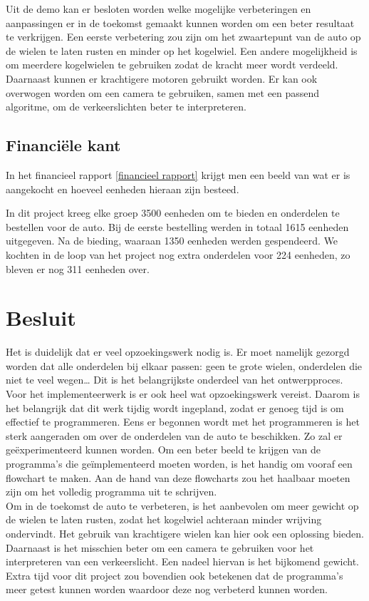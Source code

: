 \documentclass[a4paper,twoside,kulak]{kulakreport} %
\begin{document}
Uit de demo kan er besloten worden welke mogelijke verbeteringen en aanpassingen er in de toekomst gemaakt kunnen worden om een beter resultaat te verkrijgen. Een eerste verbetering zou zijn om het zwaartepunt van de auto op de wielen te laten rusten en minder op het kogelwiel. Een andere mogelijkheid is om meerdere kogelwielen te gebruiken zodat de kracht meer wordt verdeeld. Daarnaast kunnen er krachtigere motoren gebruikt worden. Er kan ook overwogen worden om een camera te gebruiken, samen met een passend algoritme, om de verkeerslichten beter te interpreteren.
\\

\subsection{Financiële kant} 
In het financieel rapport \ref{financieel rapport} krijgt men een beeld van wat er is aangekocht en hoeveel eenheden hieraan zijn besteed.  

In dit project kreeg elke groep 3500 eenheden om te bieden en onderdelen te bestellen voor de auto. Bij de eerste bestelling werden in totaal 1615 eenheden uitgegeven. Na de bieding, waaraan 1350 eenheden werden gespendeerd. We kochten in de loop van het project nog extra onderdelen voor 224 eenheden, zo bleven er nog 311 eenheden over.
\\


\section{Besluit}
Het is duidelijk dat er veel opzoekingswerk nodig is. Er moet namelijk gezorgd worden dat alle onderdelen bij elkaar passen: geen te grote wielen, onderdelen die niet te veel wegen… Dit is het belangrijkste onderdeel van het ontwerpproces.\\
Voor het implementeerwerk is er ook heel wat opzoekingswerk vereist. Daarom is het belangrijk dat dit werk tijdig wordt ingepland, zodat er genoeg tijd is om effectief te programmeren. Eens er begonnen wordt met het programmeren is het sterk aangeraden om over de onderdelen van de auto te beschikken. Zo zal er geëxperimenteerd kunnen worden. Om een beter beeld te krijgen van de programma’s die geïmplementeerd moeten worden, is het handig om vooraf een flowchart te maken. Aan de hand van deze flowcharts zou het haalbaar moeten zijn om het volledig programma uit te schrijven.\\
Om in de toekomst de auto te verbeteren, is het aanbevolen om meer gewicht op de wielen te laten rusten, zodat het kogelwiel achteraan minder wrijving ondervindt. Het gebruik van krachtigere wielen kan hier ook een oplossing bieden. Daarnaast is het misschien beter om een camera te gebruiken voor het interpreteren van een verkeerslicht. Een nadeel hiervan is het bijkomend gewicht. 
Extra tijd voor dit project zou bovendien ook betekenen dat de programma’s meer getest kunnen worden waardoor deze nog verbeterd kunnen worden.
\end{document}
